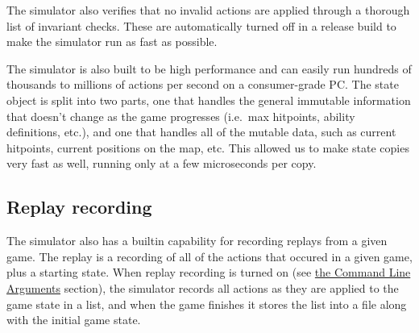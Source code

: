 The simulator also verifies that no invalid actions are applied through a
thorough list of invariant checks. These are automatically turned off in a
release build to make the simulator run as fast as possible.

The simulator is also built to be high performance and can easily run hundreds
of thousands to millions of actions per second on a consumer-grade PC\@.
The state object is split into two parts, one that handles the
general immutable information that doesn't change as the game progresses (i.e.\
max hitpoints, ability definitions, etc.), and one that handles all of the
mutable data, such as current hitpoints, current positions on the map, etc.
This allowed us to make state copies very fast as well, running only at a few
microseconds per copy.

\subsection{Replay recording}

The simulator also has a builtin capability for recording replays from a given game. The replay is a recording of all of the actions that occured in a given game, plus a starting state. When replay recording is turned on (see \hyperref[cmd-args]{the Command Line Arguments} section), the simulator records all actions as they are applied to the game state in a list, and when the game finishes it stores the list into a file along with the initial game state.

